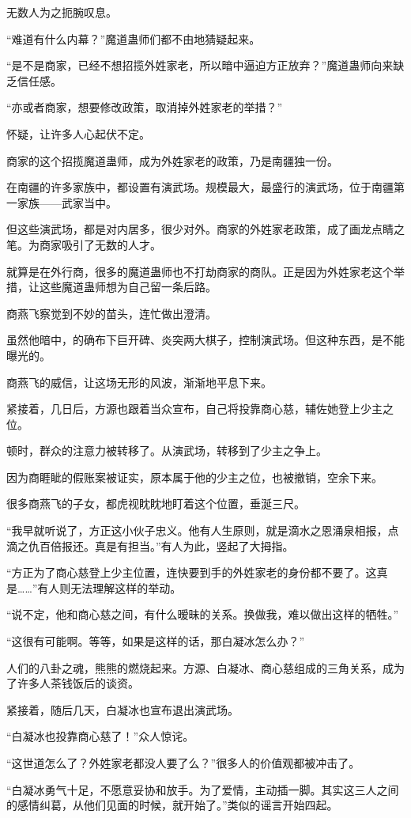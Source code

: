 \begin{this_body}
无数人为之扼腕叹息。

“难道有什么内幕？”魔道蛊师们都不由地猜疑起来。

“是不是商家，已经不想招揽外姓家老，所以暗中逼迫方正放弃？”魔道蛊师向来缺乏信任感。

“亦或者商家，想要修改政策，取消掉外姓家老的举措？”

怀疑，让许多人心起伏不定。

商家的这个招揽魔道蛊师，成为外姓家老的政策，乃是南疆独一份。

在南疆的许多家族中，都设置有演武场。规模最大，最盛行的演武场，位于南疆第一家族——武家当中。

但这些演武场，都是对内居多，很少对外。商家的外姓家老政策，成了画龙点睛之笔。为商家吸引了无数的人才。

就算是在外行商，很多的魔道蛊师也不打劫商家的商队。正是因为外姓家老这个举措，让这些魔道蛊师想为自己留一条后路。

商燕飞察觉到不妙的苗头，连忙做出澄清。

虽然他暗中，的确布下巨开碑、炎突两大棋子，控制演武场。但这种东西，是不能曝光的。

商燕飞的威信，让这场无形的风波，渐渐地平息下来。

紧接着，几日后，方源也跟着当众宣布，自己将投靠商心慈，辅佐她登上少主之位。

顿时，群众的注意力被转移了。从演武场，转移到了少主之争上。

因为商睚眦的假账案被证实，原本属于他的少主之位，也被撤销，空余下来。

很多商燕飞的子女，都虎视眈眈地盯着这个位置，垂涎三尺。

“我早就听说了，方正这小伙子忠义。他有人生原则，就是滴水之恩涌泉相报，点滴之仇百倍报还。真是有担当。”有人为此，竖起了大拇指。

“方正为了商心慈登上少主位置，连快要到手的外姓家老的身份都不要了。这真是……”有人则无法理解这样的举动。

“说不定，他和商心慈之间，有什么暧昧的关系。换做我，难以做出这样的牺牲。”

“这很有可能啊。等等，如果是这样的话，那白凝冰怎么办？”

人们的八卦之魂，熊熊的燃烧起来。方源、白凝冰、商心慈组成的三角关系，成为了许多人茶钱饭后的谈资。

紧接着，随后几天，白凝冰也宣布退出演武场。

“白凝冰也投靠商心慈了！”众人惊诧。

“这世道怎么了？外姓家老都没人要了么？”很多人的价值观都被冲击了。

“白凝冰勇气十足，不愿意妥协和放手。为了爱情，主动插一脚。其实这三人之间的感情纠葛，从他们见面的时候，就开始了。”类似的谣言开始四起。


\end{this_body}
